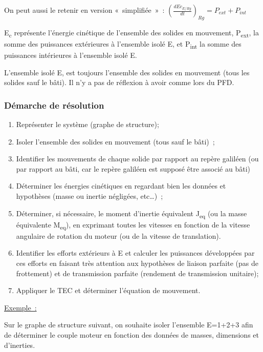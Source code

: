 On peut aussi le retenir en version «~simplifiée~»~: \(\left( \frac{{dEc}_{E/Rg}}{dt} \right)_{Rg} = P_{ext} + P_{int}\)

E\textsubscript{c} représente l'énergie cinétique de l'ensemble des solides en mouvement, P\textsubscript{ext}, la somme des puissances extérieures à l'ensemble isolé E, et P\textsubscript{int} la somme des puissances intérieures à l'ensemble isolé E.

L'ensemble isolé E, est toujours l'ensemble des solides en mouvement (tous les solides sauf le bâti). Il n'y a pas de réflexion à avoir comme lors du PFD.

\hypertarget{duxe9marche-de-ruxe9solution-1}{%
\subsubsection{Démarche de résolution}\label{duxe9marche-de-ruxe9solution-1}}

\begin{enumerate}
\def\labelenumi{\arabic{enumi}.}
\item
  Représenter le système (graphe de structure);
\item
  Isoler l'ensemble des solides en mouvement (tous sauf le bâti)~;
\item
  Identifier les mouvements de chaque solide par rapport au repère galiléen (ou par rapport au bâti, car le repère galiléen est supposé être associé au bâti)
\item
  Déterminer les énergies cinétiques en regardant bien les données et hypothèses (masse ou inertie négligées, etc\ldots)~;
\item
  Déterminer, si nécessaire, le moment d'inertie équivalent J\textsubscript{eq} (ou la masse équivalente M\textsubscript{eq}), en exprimant toutes les vitesses en fonction de la vitesse angulaire de rotation du moteur (ou de la vitesse de translation).
\item
  Identifier les efforts extérieurs à E et calculer les puissances développées par ces efforts en faisant très attention aux hypothèses de liaison parfaite (pas de frottement) et de transmission parfaite (rendement de transmission unitaire);
\item
  Appliquer le TEC et déterminer l'équation de mouvement.
\end{enumerate}

\ul{Exemple~:}

Sur le graphe de structure suivant, on souhaite isoler l'ensemble E=1+2+3 afin de déterminer le couple moteur en fonction des données de masses, dimensions et d'inerties.

